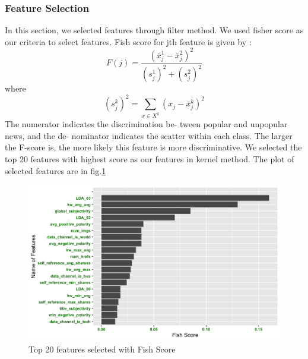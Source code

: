 \documentclass[letterpaper,12pt]{article}
\begin{document}
\subsubsection{Feature Selection}
In this section, we selected features through filter method. We used fisher score as our criteria to select features. Fish score for jth feature is given by \cite{a3}:
\[
F(j)=\frac{\left(\bar{x}_{j}^{1}-\bar{x}_{j}^{2}\right)^{2}}{\left(s_{j}^{1}\right)^{2}+\left(s_{j}^{2}\right)^{2}}
\] where
\[
\left(s_{j}^{k}\right)^{2}=\sum_{x \in X^{k}}\left(x_{j}-\bar{x}_{j}^{k}\right)^{2}
\]
The numerator indicates the discrimination be- tween popular and unpopular news, and the de- nominator indicates the scatter within each class. The larger the F-score is, the more likely this feature is more discriminative. We selected the top 20 features with highest score as our features in kernel method. The plot of selected features are in fig.\ref{fig5}
\begin{figure}
\centering
    \includegraphics[width=0.7\linewidth]{5.png}
    \caption{Top 20 features selected with Fish Score}
    \label{fig5}
\end{figure}
\end{document}
